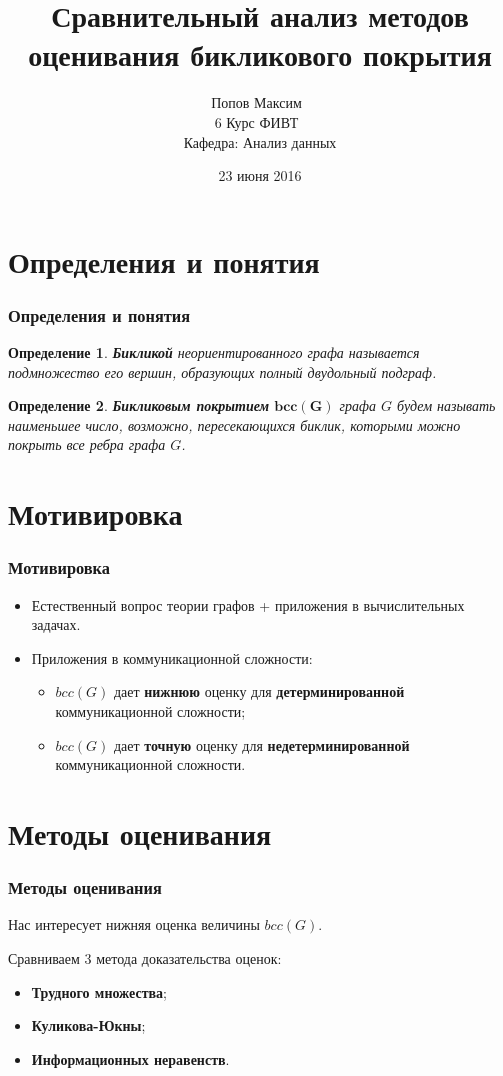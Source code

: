 \documentclass[utf8]{beamer}
\title{Сравнительный анализ методов оценивания бикликового покрытия}
\date{23 июня 2016}
\author{Попов Максим\ \\ 6 Курс ФИВТ\ \\ Кафедра: Анализ данных}
\newtheorem{mdefinition}{Определение}[section]
\begin{document}
    \begin{frame}
		\titlepage
	\end{frame}
	
	\section{Определения и понятия}
	\begin{frame}
		\frametitle{Определения и понятия}
		\begin{mdefinition}
		    \textbf{Бикликой} неориентированного графа называется подмножество его вершин, образующих полный 
		    двудольный подграф.
		\end{mdefinition}
		
		\begin{mdefinition}
		    \textbf{Бикликовым покрытием} $\boldsymbol{bcc(G)}$ графа $G$ будем называть наименьшее число, возможно, пересекающихся
		    биклик, которыми можно покрыть все ребра графа $G$.
		\end{mdefinition}
	\end{frame}
	
	\section{Мотивировка}
	\begin{frame}
		\frametitle{Мотивировка}
		\begin{itemize}
		    \item[1)] Естественный вопрос теории графов + приложения в вычислительных задачах.
		    \item[2)] Приложения в коммуникационной сложности:
		    \medskip
		    \begin{itemize}
				\item $bcc(G)$ дает \textbf{нижнюю} оценку для \textbf{детерминированной} коммуникационной сложности;
				\item $bcc(G)$ дает \textbf{точную} оценку для \textbf{недетерминированной} коммуникационной сложности.
		    \end{itemize}
		\end{itemize}
	\end{frame}
	
	\section{Методы оценивания}
	\begin{frame}
		\frametitle{Методы оценивания}
		Нас интересует нижняя оценка величины $bcc(G)$.
		\medskip
		
		Сравниваем 3 метода доказательства оценок:
		\begin{itemize}
		    \item[1)] \textbf{Трудного множества};
		    \item[2)] \textbf{Куликова-Юкны};
		    \item[3)] \textbf{Информационных неравенств}.
		\end{itemize}

	\end{frame}
	
\end{document}
